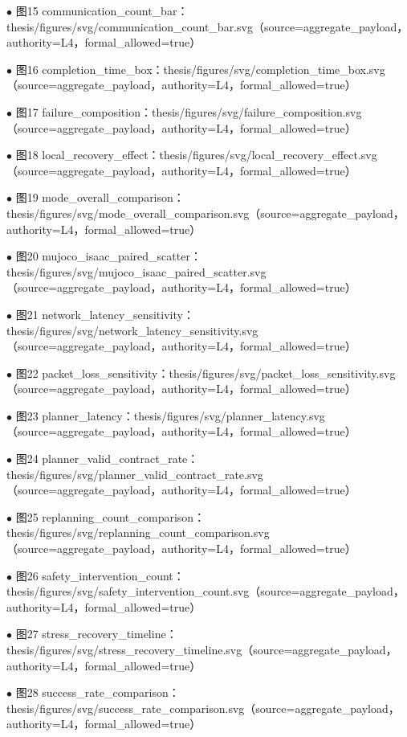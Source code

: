 \noindent $\bullet$ 图15 communication\_count\_bar：thesis/figures/svg/communication\_count\_bar.svg（source=aggregate\_payload，authority=L4，formal\_allowed=true）\par
\noindent $\bullet$ 图16 completion\_time\_box：thesis/figures/svg/completion\_time\_box.svg（source=aggregate\_payload，authority=L4，formal\_allowed=true）\par
\noindent $\bullet$ 图17 failure\_composition：thesis/figures/svg/failure\_composition.svg（source=aggregate\_payload，authority=L4，formal\_allowed=true）\par
\noindent $\bullet$ 图18 local\_recovery\_effect：thesis/figures/svg/local\_recovery\_effect.svg（source=aggregate\_payload，authority=L4，formal\_allowed=true）\par
\noindent $\bullet$ 图19 mode\_overall\_comparison：thesis/figures/svg/mode\_overall\_comparison.svg（source=aggregate\_payload，authority=L4，formal\_allowed=true）\par
\noindent $\bullet$ 图20 mujoco\_isaac\_paired\_scatter：thesis/figures/svg/mujoco\_isaac\_paired\_scatter.svg（source=aggregate\_payload，authority=L4，formal\_allowed=true）\par
\noindent $\bullet$ 图21 network\_latency\_sensitivity：thesis/figures/svg/network\_latency\_sensitivity.svg（source=aggregate\_payload，authority=L4，formal\_allowed=true）\par
\noindent $\bullet$ 图22 packet\_loss\_sensitivity：thesis/figures/svg/packet\_loss\_sensitivity.svg（source=aggregate\_payload，authority=L4，formal\_allowed=true）\par
\noindent $\bullet$ 图23 planner\_latency：thesis/figures/svg/planner\_latency.svg（source=aggregate\_payload，authority=L4，formal\_allowed=true）\par
\noindent $\bullet$ 图24 planner\_valid\_contract\_rate：thesis/figures/svg/planner\_valid\_contract\_rate.svg（source=aggregate\_payload，authority=L4，formal\_allowed=true）\par
\noindent $\bullet$ 图25 replanning\_count\_comparison：thesis/figures/svg/replanning\_count\_comparison.svg（source=aggregate\_payload，authority=L4，formal\_allowed=true）\par
\noindent $\bullet$ 图26 safety\_intervention\_count：thesis/figures/svg/safety\_intervention\_count.svg（source=aggregate\_payload，authority=L4，formal\_allowed=true）\par
\noindent $\bullet$ 图27 stress\_recovery\_timeline：thesis/figures/svg/stress\_recovery\_timeline.svg（source=aggregate\_payload，authority=L4，formal\_allowed=true）\par
\noindent $\bullet$ 图28 success\_rate\_comparison：thesis/figures/svg/success\_rate\_comparison.svg（source=aggregate\_payload，authority=L4，formal\_allowed=true）\par

